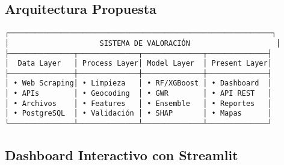 \documentclass[11pt,a4paper]{article}
\begin{document}
\subsection{Arquitectura Propuesta}

\begin{tcolorbox}[colframe=usachblue,colback=blue!5]
\begin{verbatim}
┌─────────────────────────────────────────────────────────────┐
│                     SISTEMA DE VALORACIÓN                    │
├───────────────┬──────────────┬──────────────┬──────────────┤
│  Data Layer   │ Process Layer│ Model Layer  │ Present Layer│
├───────────────┼──────────────┼──────────────┼──────────────┤
│ • Web Scraping│ • Limpieza   │ • RF/XGBoost │ • Dashboard  │
│ • APIs        │ • Geocoding  │ • GWR        │ • API REST   │
│ • Archivos    │ • Features   │ • Ensemble   │ • Reportes   │
│ • PostgreSQL  │ • Validación │ • SHAP       │ • Mapas      │
└───────────────┴──────────────┴──────────────┴──────────────┘
\end{verbatim}
\end{tcolorbox}

\subsection{Dashboard Interactivo con Streamlit}
\end{document}
